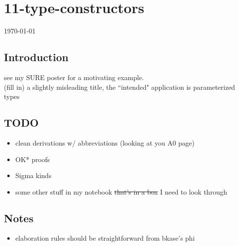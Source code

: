 \documentclass[12pt]{article}
\begin{document}
\section*{11-type-constructors}
\today
\subsection*{Introduction}
see my SURE poster for a motivating example. \\
(fill in) a slightly misleading title, the ``intended" application is parameterized types
\subsection*{TODO}
\begin{itemize}
    \item clean derivations w/ abbreviations (looking at you A0 page)
    \item OK* proofs
    \item Sigma kinds
    \item some other stuff in my notebook \sout{that's in a box} I need to look through
\end{itemize}
\subsection*{Notes}
\begin{itemize}
    \item elaboration rules should be straightforward from bkase's phi
\end{itemize}
\end{document}
